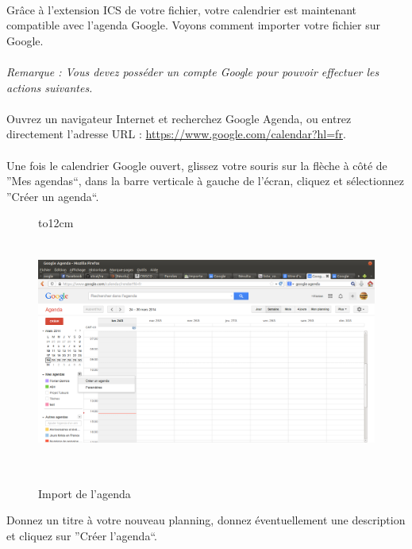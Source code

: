 \documentclass[a4paper,10pt]{report}
\begin{document}
	\paragraph{}
	  Grâce à l'extension ICS de votre fichier, votre calendrier est maintenant compatible avec l'agenda Google.
	  Voyons comment importer votre fichier sur Google.
	  
	  
	\paragraph{}
	  \textit{Remarque : Vous devez posséder un compte Google pour pouvoir effectuer les actions suivantes.}
	
	\paragraph{}
	  Ouvrez un navigateur Internet et recherchez Google Agenda, ou entrez directement l'adresse URL : \url{https://www.google.com/calendar?hl=fr}.
	  ~\\~\\
	  Une fois le calendrier Google ouvert, glissez votre souris sur la flèche à côté de ''Mes agendas``, dans la barre verticale à gauche de l'écran, cliquez et sélectionnez ''Créer un agenda``.
	  
	  \begin{figure}[H]
	   \hbox to12cm{\hss\includegraphics[height=8cm,width=18cm]{../general/google.png}\hss}
	   \caption{Import de l'agenda}
	 \end{figure}
	  
	  Donnez un titre à votre nouveau planning, donnez éventuellement une description et cliquez sur ''Créer l'agenda``.
	  
\end{document}
